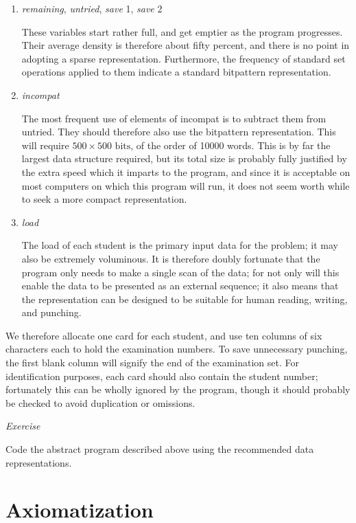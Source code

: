 \documentclass[twoside,11pt]{book}
\begin{document}
\begin{enumerate}[wide, nosep, label=(\arabic*)]
	\item \textit{remaining}, \textit{untried}, \textit{save} 1, \textit{save} 2

	\noindent
	These variables start rather full, and get emptier as the program progresses. Their average density is therefore about fifty percent, and there is no point in adopting a sparse representation. Furthermore, the frequency of standard set operations applied to them indicate a standard bitpattern representation.

	\item \textit{incompat}

	\noindent
	The most frequent use of elements of incompat is to subtract them from untried. They should therefore also use the bitpattern representation. This will require $500 \times 500 \text{ bits}$, of the order of 10000 words. This is by far the largest data structure required, but its total size is probably fully justified by the extra speed which it imparts to the program, and since it is acceptable on most computers on which this program will run, it does not seem worth while to seek a more compact representation.

	\item \textit{load}

	\noindent
	The load of each student is the primary input data for the problem; it may also be extremely voluminous. It is therefore doubly fortunate that the program only needs to make a single scan of the data; for not only will this enable the data to be presented as an external sequence; it also means that the representation can be designed to be suitable for human reading, writing, and punching.

\end{enumerate}

We therefore allocate one card for each student, and use ten columns of six characters each to hold the examination numbers. To save unnecessary punching, the first blank column will signify the end of the examination set. For identification purposes, each card should also contain the student number; fortunately this can be wholly ignored by the program, though it should probably be checked to avoid duplication or omissions.

\noindent
\textit{Exercise}
\nopagebreak

\noindent
Code the abstract program described above using the recommended data representations.

\section{Axiomatization}
\end{document}
